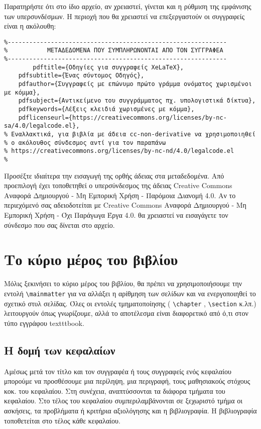\begin{refsection}
Παρατηρήστε ότι στο ίδιο αρχείο, αν χρειαστεί, γίνεται και η ρύθμιση της εμφάνισης των υπερσυνδέσμων.
Η περιοχή που θα χρειαστεί να επεξεργαστούν οι συγγραφείς είναι η ακόλουθη:
\begin{verbatim}
%-------------------------------------------------------------
%			ΜΕΤΑΔΕΔΟΜΕΝΑ ΠΟΥ ΣΥΜΠΛΗΡΩΝΟΝΤΑΙ ΑΠΟ ΤΟΝ ΣΥΓΓΡΑΦΕΑ
%-------------------------------------------------------------
    	pdftitle={Οδηγίες για συγγραφείς XeLaTeX},
	pdfsubtitle={Ένας σύντομος Οδηγός},
	pdfauthor={Συγγραφείς με επώνυμο πρώτο γράμμα ονόματος χωρισμένοι με κόμμα},
	pdfsubject={Αντικείμενο του συγγράμματος πχ. υπολογιστικά δίκτυα},
	pdfkeywords={Λέξεις κλειδιά χωρισμένες με κόμμα},
	pdflicenseurl={https://creativecommons.org/licenses/by-nc-sa/4.0/legalcode.el},
% Εναλλακτικά, για βιβλία με άδεια cc-non-derivative να χρησιμοποιηθεί
% ο ακόλουθος σύνδεσμος αντί για τον παραπάνω
% https://creativecommons.org/licenses/by-nc-nd/4.0/legalcode.el
%
\end{verbatim}
Προσέξτε ιδιαίτερα την εισαγωγή της ορθής άδειας στα μεταδεδομένα. Από προεπιλογή έχει τοποθετηθεί ο υπερσύνδεσμος
της άδειας Creative Commons Αναφορά Δημιουργού - Μη Εμπορική Χρήση - Παρόμοια Διανομή 4.0. Αν το 
περιεχόμενό σας αδειοδοτείται με Creative Commons Αναφορά Δημιουργού - Μη Εμπορική Χρήση - Όχι Παράγωγα Έργα 4.0.
θα χρειαστεί να εισαγάγετε τον σύνδεσμο που σας δίνεται στο αρχείο.
\section{Το κύριο μέρος του βιβλίου}
Μόλις ξεκινήσει το κύριο μέρος του βιβλίου, θα πρέπει να χρησιμοποιήσουμε την εντολή
\verb|\mainmatter| για να αλλάξει η αρίθμηση των σελίδων και να ενεργοποιηθεί το σχετικό στυλ
σελίδας. Όλες οι εντολές τμηματοποίησης ( \verb|\chapter| , \verb|\section| κ.λπ.) λειτουργούν όπως γνωρίζουμε, αλλά το αποτέλεσμα είναι διαφορετικό από ό,τι στον τύπο εγγράφου texttt{book}.
\subsection{Η δομή των κεφαλαίων}
Αμέσως μετά τον τίτλο και τον συγγραφέα ή τους συγγραφείς ενός κεφαλαίου μπορούμε να προσθέσουμε
μια περίληψη, μια περιγραφή, τους μαθησιακούς στόχους κοκ. του κεφαλαίου. Στη συνέχεια,
αναπτύσσονται τα διάφορα τμήματα του κεφαλαίου. Στο τέλος του κεφαλαίου συμπεριλαμβάνονται σε
ξεχωριστό τμήμα οι ασκήσεις, τα προβλήματα ή κριτήρια αξιολόγησης και η βιβλιογραφία. Η βιβλιογραφία
τοποθετείται στο τέλος κάθε κεφαλαίου.

\end{refsection}
